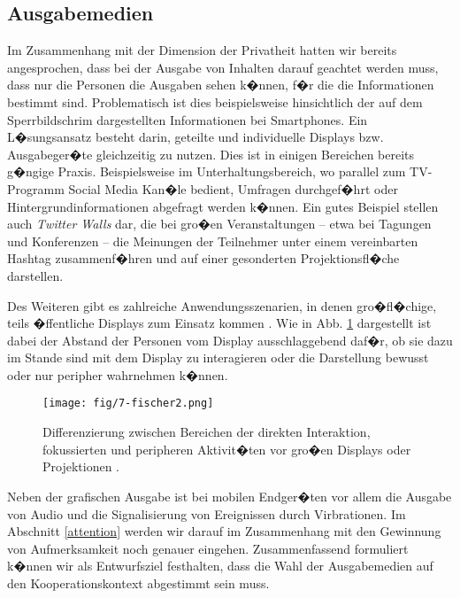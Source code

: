 \subsection{Ausgabemedien}
Im Zusammenhang mit der Dimension der Privatheit hatten wir bereits angesprochen, dass bei der Ausgabe von Inhalten darauf geachtet werden muss, dass nur die  Personen die Ausgaben sehen k�nnen, f�r die die Informationen bestimmt sind. Problematisch ist dies beispielsweise hinsichtlich der auf dem Sperrbildschrim dargestellten Informationen bei Smartphones. Ein L�sungsansatz besteht darin,  geteilte und individuelle Displays bzw. Ausgabeger�te gleichzeitig zu nutzen. Dies ist in einigen Bereichen bereits g�ngige Praxis. Beispielsweise im Unterhaltungsbereich, wo parallel zum TV-Programm Social Media Kan�le bedient, Umfragen durchgef�hrt oder Hintergrundinformationen abgefragt werden k�nnen. Ein gutes Beispiel stellen auch \textit{Twitter Walls} dar, die bei gro�en Veranstaltungen -- etwa bei Tagungen und Konferenzen -- die Meinungen der Teilnehmer unter einem vereinbarten Hashtag zusammenf�hren und auf einer gesonderten Projektionsfl�che darstellen.

Des Weiteren gibt es zahlreiche Anwendungsszenarien, in denen gro�fl�chige, teils �ffentliche Displays zum Einsatz kommen \cite{Fischer2010}. Wie in Abb. \ref{fig:fischer-display} dargestellt ist dabei der Abstand der Personen vom Display ausschlaggebend daf�r, ob sie dazu im Stande sind mit dem Display zu interagieren oder die Darstellung bewusst oder nur peripher wahrnehmen k�nnen. 


\begin{figure}[h!]
\centering
\texttt{[image: fig/7-fischer2.png]}
\caption{Differenzierung zwischen Bereichen der direkten Interaktion, fokussierten und peripheren Aktivit�ten vor gro�en Displays oder Projektionen \cite{Fischer2010}.}
\label{fig:fischer-display}
\end{figure}
 
Neben der grafischen Ausgabe ist bei mobilen Endger�ten vor allem die Ausgabe von Audio und die Signalisierung von Ereignissen durch Virbrationen. Im Abschnitt \ref{attention} werden wir darauf im Zusammenhang mit den Gewinnung von Aufmerksamkeit noch genauer eingehen.
%
Zusammenfassend formuliert k�nnen wir als Entwurfsziel festhalten, dass die Wahl der Ausgabemedien auf den Kooperationskontext abgestimmt sein muss. 
 

